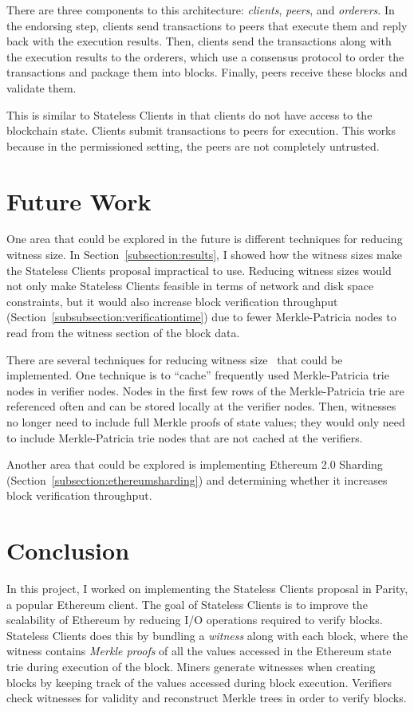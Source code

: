 \documentclass[12pt]{article}
\newcounter{protocol}
\newcommand{\System}{Stateless Clients\xspace}
\begin{document}
There are three components to this architecture: \emph{clients}, \emph{peers}, and \emph{orderers}. In the endorsing step, clients send transactions to peers that execute them and reply back with the execution results. Then, clients send the transactions along with the execution results to the orderers, which use a consensus protocol to order the transactions and package them into blocks. Finally, peers receive these blocks and validate them.

This is similar to \System in that clients do not have access to the blockchain state. Clients submit transactions to peers for execution. This works because in the permissioned setting, the peers are not completely untrusted.

\section{Future Work}

One area that could be explored in the future is different techniques for reducing witness size. In Section~\ref{subsection:results}, I showed how the witness sizes make the \System proposal impractical to use. Reducing witness sizes would not only make \System feasible in terms of network and disk space constraints, but it would also increase block verification throughput (Section~\ref{subsubsection:verificationtime}) due to fewer Merkle-Patricia nodes to read from the witness section of the block data.

There are several techniques for reducing witness size~\cite{ethereum-stateless-analysis} that could be implemented. One technique is to ``cache'' frequently used Merkle-Patricia trie nodes in verifier nodes. Nodes in the first few rows of the Merkle-Patricia trie are referenced often and can be stored locally at the verifier nodes. Then, witnesses no longer need to include full Merkle proofs of state values; they would only need to include Merkle-Patricia trie nodes that are not cached at the verifiers.

Another area that could be explored is implementing Ethereum 2.0 Sharding (Section~\ref{subsection:ethereumsharding}) and determining whether it increases block verification throughput.


\section{Conclusion}

In this project, I worked on implementing the \System proposal in Parity, a popular Ethereum client. The goal of \System is to improve the scalability of Ethereum by reducing I/O operations required to verify blocks. \System does this by bundling a \emph{witness} along with each block, where the witness contains \emph{Merkle proofs} of all the values accessed in the Ethereum state trie during execution of the block. Miners generate witnesses when creating blocks by keeping track of the values accessed during block execution. Verifiers check witnesses for validity and reconstruct Merkle trees in order to verify blocks.
\end{document}
